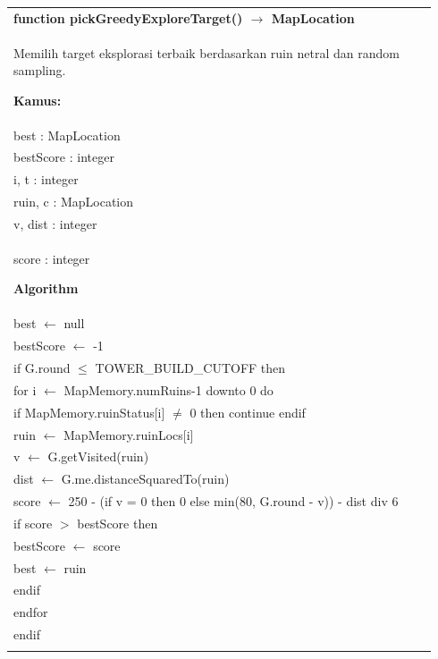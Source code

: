 \documentclass{article}
\newenvironment{pseudobox}
{
\centering
\begin{longtable}{|p{0.94\linewidth}|}
\hline
}
{
\\ \hline
\end{longtable}
\vspace{0.05cm}
}
\begin{document}
\begin{pseudobox}
\textbf{function pickGreedyExploreTarget() $\rightarrow$ MapLocation} \\
{ Memilih target eksplorasi terbaik berdasarkan ruin netral dan random sampling. }

\textbf{Kamus:} \\
\hspace*{1em} best : MapLocation \\
\hspace*{1em} bestScore : integer \\
\hspace*{1em} i, t : integer \\
\hspace*{1em} ruin, c : MapLocation \\
\hspace*{1em} v, dist : integer \\
\hspace*{1em} score : integer

\textbf{Algorithm} \\
\hspace*{1em} best $\leftarrow$ null \\
\hspace*{1em} bestScore $\leftarrow$ -1 \\

\hspace*{1em} if G.round $\leq$ TOWER\_BUILD\_CUTOFF then \\
\hspace*{2em} for i $\leftarrow$ MapMemory.numRuins-1 downto 0 do \\
\hspace*{3em} if MapMemory.ruinStatus[i] $\neq$ 0 then continue endif \\

\hspace*{3em} ruin $\leftarrow$ MapMemory.ruinLocs[i] \\
\hspace*{3em} v $\leftarrow$ G.getVisited(ruin) \\
\hspace*{3em} dist $\leftarrow$ G.me.distanceSquaredTo(ruin) \\
\hspace*{3em} score $\leftarrow$ 250 - (if v = 0 then 0 else min(80, G.round - v)) - dist div 6 \\

\hspace*{3em} if score $>$ bestScore then \\
\hspace*{4em} bestScore $\leftarrow$ score \\
\hspace*{4em} best $\leftarrow$ ruin \\
\hspace*{3em} endif \\
\hspace*{2em} endfor \\
\hspace*{1em} endif \\


\end{pseudobox}
\end{document}

